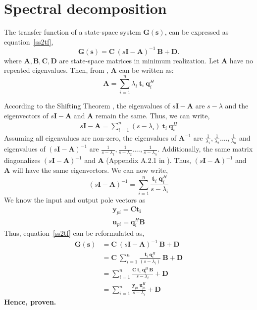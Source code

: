 \section{Spectral decomposition}
The transfer function of a state-space system $\mathbf{G(s)}$, can be expressed as equation~\eqref{ss2tf},
\begin{equation}
 \bm{G(s)} = \bm{C} \: (s\bm{I} - \bm{A})^{-1} \: \bm{B} + \bm{D} \text{.}
  \label{ss2tf}
\end{equation}
where $\bm{A}, \bm{B}, \bm{C}, \bm{D}$  are state-space matrices in minimum realization. Let $\bm{A}$  have no repeated eigenvalues. Then, from \cite{Sko05}, $\bm{A}$ can be written as:
\begin{equation}
\bm{A} = \sum_{i=1}^n \lambda_i \: \bm{t}_i\: \bm{q}_i^H 
\label{specDec1}
\end{equation}

According to the Shifting Theorem \cite{Bha12}, the eigenvalues of $s\bm{I}-\bm{A}$ are $s-\lambda$ and the eigenvectors of $s\bm{I}-\bm{A}$ and $\bm{A}$ remain the same. Thus, we can write,
\begin{align*}
  s\bm{I} - \bm{A} = \sum_{i=1}^n (s - \lambda_i) \: \bm{t}_i\: \bm{q}_i^H   
\end{align*}
    Assuming all eigenvalues are non-zero, the eigenvalues of $\bm{A}^{-1}$ are ${\frac{1}{\lambda_1},\frac{1}{\lambda_2}....,\frac{1}{\lambda_n}}$ and eigenvalues of $(s\bm{I} - \bm{A})^{-1}$ are ${\frac{1}{s-\lambda_1},\frac{1}{s-\lambda_2}....,\frac{1}{s-\lambda_n}}$. Additionally, the same matrix diagonalizes $(s\bm{I} - \bm{A})^{-1}$ and $\bm{A}$ (Appendix A.2.1 in \cite{Sko05}). Thus, $(s\bm{I} - \bm{A})^{-1}$ and $\bm{A}$ will have the same eigenvectors. We can now write,
\begin{equation}
(s\bm{I} - \bm{A})^{-1} = \sum_{i=1}^n \frac{\bm{t}_i\: \bm{q}_i^H}{s - \lambda_i} 
\label{specDec2}
\end{equation}
We know the input and output pole vectors as
\begin{align*}
\bm{y}_{pi} = \bm{C}\bm{t_i} \\
\bm{u}_{pi}= \bm{q}_{i}^H\bm{B} 
\end{align*}
Thus, equation~\eqref{ss2tf} can be reformulated as,
\begin{align*}
\bm{G(s)} &=  \bm{C} \: (s\bm{I} - \bm{A})^{-1} \: \bm{B} + \bm{D} \\
	&= \bm{C}\: \sum_{i=1}^n \frac{\bm{t}_i\: \bm{q}_i^H}{(s - \lambda_i)}\: \bm{B} + \bm{D} \\
	&= \sum_{i=1}^n \frac{\bm{C}\: \bm{t}_i\: \bm{q}_i^H\: \bm{B}}{s - \lambda_i} + \bm{D} \\
    &= \sum_{i=1}^n \frac{\bm{y}_{pi}\: \bm{u}_{pi}^H}{s - \lambda_i} + \bm{D} 
\end{align*}
\textbf{Hence, proven.}

